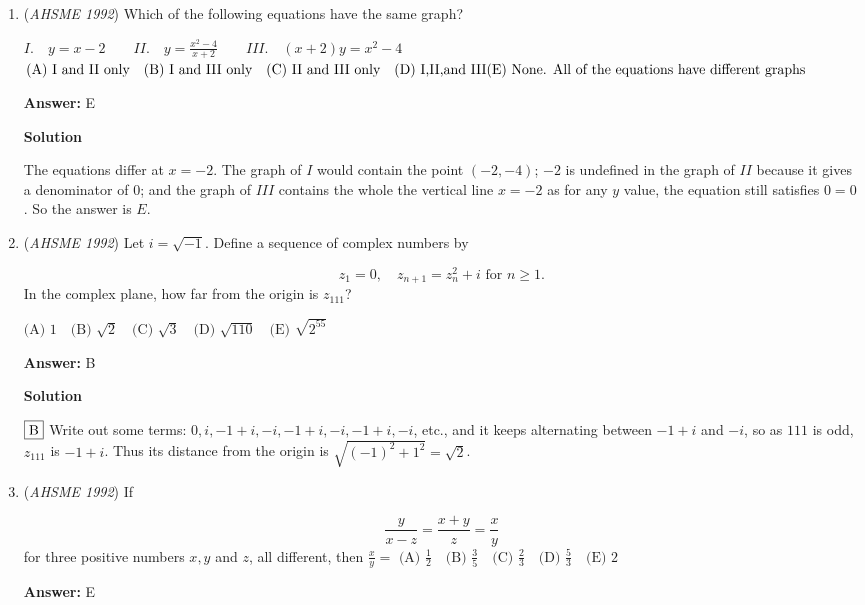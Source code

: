\begin{enumerate}
 


	\item (\textit{AHSME 1992}) Which of the following equations have the same graph?


 $I.\quad y=x-2 \qquad II.\quad y=\frac{x^2-4}{x+2}\qquad III.\quad (x+2)y=x^2-4$
$\text{(A) I and II only} \quad \text{(B) I and III only} \quad \text{(C) II and III only} \quad \text{(D) I,II,and III} \quad \\ \text{(E) None. All of the equations have different graphs}$

 \textbf{Answer: }E



\textbf{Solution}

The equations differ at $x=-2$. The graph of $I$ would contain the point $(-2, -4)$; $-2$ is undefined in the graph of $II$ because it gives a denominator of $0$; and the graph of $III$ contains the whole the vertical line $x = -2$ as for any $y$ value, the equation still satisfies $0 = 0$. So the answer is ${E}$.

 


	\item (\textit{AHSME 1992}) Let $i=\sqrt{-1}$. Define a sequence of complex numbers by


 
 \[z_1=0,\quad z_{n+1}=z_{n}^2+i \text{ for } n\ge1.\]
In the complex plane, how far from the origin is $z_{111}$?


 $\text{(A) } 1\quad \text{(B) } \sqrt{2}\quad \text{(C) } \sqrt{3}\quad \text{(D) } \sqrt{110}\quad \text{(E) } \sqrt{2^{55}}$

 \textbf{Answer: }B



\textbf{Solution}

$\fbox{B}$ Write out some terms: $0, i, -1+i, -i, -1+i, -i, -1+i, -i$, etc., and it keeps alternating between $-1+i$ and $-i$, so as $111$ is odd, $z_{111}$ is $-1+i$. Thus its distance from the origin is $\sqrt{(-1)^2+1^2} = \sqrt{2}$.

 


	\item (\textit{AHSME 1992}) If

 \[\frac{y}{x-z}=\frac{x+y}{z}=\frac{x}{y}\]
for three positive numbers $x,y$ and $z$, all different, then $\frac{x}{y}=$
$\text{(A) } \frac{1}{2}\quad \text{(B) } \frac{3}{5}\quad \text{(C) } \frac{2}{3}\quad \text{(D) } \frac{5}{3}\quad \text{(E) } 2$

 \textbf{Answer: }E




\end{enumerate}
